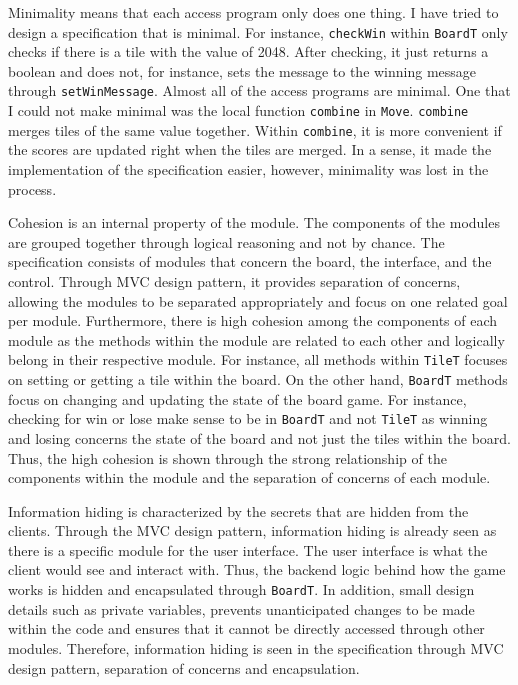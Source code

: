 \documentclass[12pt]{article}
\begin{document}
Minimality means that each access program only does one thing. I have tried to design a specification that is minimal. For instance, \verb|checkWin| within \verb|BoardT| only checks if there is a tile with the value of 2048. After checking, it just returns a boolean and does not, for instance, sets the message to the winning message through \verb|setWinMessage|. Almost all of the access programs are minimal. One that I could not make minimal was the local function \verb|combine| in \verb|Move|.  \verb|combine| merges tiles of the same value together. Within \verb|combine|, it is more convenient if the scores are updated right when the tiles are merged. In a sense, it made the implementation of the specification easier, however, minimality was lost in the process.

Cohesion is an internal property of the module. The components of the modules are grouped together through logical reasoning and not by chance. The specification consists of modules that concern the board, the interface, and the control. Through MVC design pattern, it provides separation of concerns, allowing the modules to be separated appropriately and focus on one related goal per module. Furthermore, there is high cohesion among the components of each module as the methods within the module are related to each other and logically belong in their respective module. For instance, all methods within \verb|TileT| focuses on setting or getting a tile within the board. On the other hand, \verb|BoardT| methods focus on changing and updating the state of the board game. For instance, checking for win or lose make sense to be in \verb|BoardT| and not \verb|TileT| as winning and losing concerns the state of the board and not just the tiles within the board. Thus, the high cohesion is shown through the strong relationship of the components within the module and the separation of concerns of each module.

Information hiding is characterized by the secrets that are hidden from the clients. Through the MVC design pattern, information hiding is already seen as there is a specific module for the user interface. The user interface is what the client would see and interact with. Thus, the backend logic behind how the game works is hidden and encapsulated through \verb|BoardT|. In addition, small design details such as private variables, prevents unanticipated changes to be made within the code and ensures that it cannot be directly accessed through other modules. Therefore, information hiding is seen in the specification through MVC design pattern, separation of concerns and encapsulation.
\end{document}
